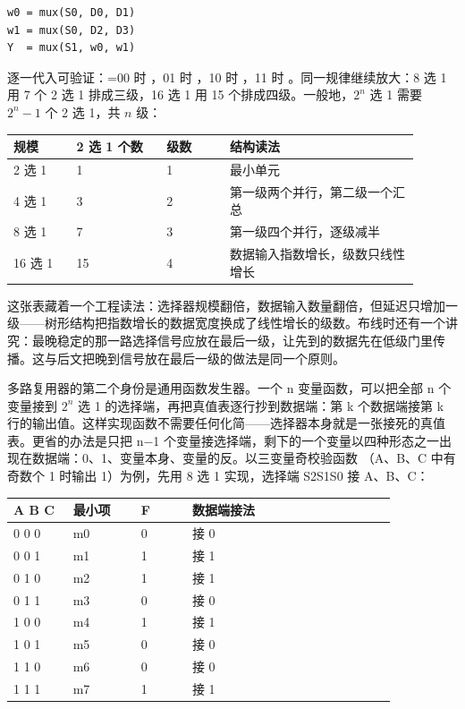 \begin{lstlisting}
w0 = mux(S0, D0, D1)
w1 = mux(S0, D2, D3)
Y  = mux(S1, w0, w1)
\end{lstlisting}

逐一代入可验证：=00 时 ，01 时 ，10 时 ，11 时 。同一规律继续放大：8 选 1 用 7 个 2 选 1 排成三级，16 选 1 用 15 个排成四级。一般地，$2^n$ 选 1 需要 $2^n - 1$ 个 2 选 1，共 $n$ 级：

\begin{longtable}{L{0.14\linewidth}L{0.2\linewidth}L{0.14\linewidth}L{0.42\linewidth}}
\toprule
规模 & 2 选 1 个数 & 级数 & 结构读法 \\
 选 1 & 1 & 1 & 最小单元 \\
4 选 1 & 3 & 2 & 第一级两个并行，第二级一个汇总 \\
8 选 1 & 7 & 3 & 第一级四个并行，逐级减半 \\
16 选 1 & 15 & 4 & 数据输入指数增长，级数只线性增长 \\
\bottomrule
\end{longtable}

这张表藏着一个工程读法：选择器规模翻倍，数据输入数量翻倍，但延迟只增加一级——树形结构把指数增长的数据宽度换成了线性增长的级数。布线时还有一个讲究：最晚稳定的那一路选择信号应放在最后一级，让先到的数据先在低级门里传播。这与后文把晚到信号放在最后一级的做法是同一个原则。

多路复用器的第二个身份是通用函数发生器。一个 n 变量函数，可以把全部 n 个变量接到 $2^n$ 选 1 的选择端，再把真值表逐行抄到数据端：第 k 个数据端接第 k 行的输出值。这样实现函数不需要任何化简——选择器本身就是一张接死的真值表。更省的办法是只把 n$-$1 个变量接选择端，剩下的一个变量以四种形态之一出现在数据端：0、1、变量本身、变量的反。以三变量奇校验函数 （A、B、C 中有奇数个 1 时输出 1）为例，先用 8 选 1 实现，选择端 S2S1S0 接 A、B、C：

\begin{longtable}{L{0.14\linewidth}L{0.16\linewidth}L{0.12\linewidth}L{0.48\linewidth}}
\toprule
A B C & 最小项 & F & 数据端接法 \\
 0 0 & m0 & 0 &  接 0 \\
0 0 1 & m1 & 1 &  接 1 \\
0 1 0 & m2 & 1 &  接 1 \\
0 1 1 & m3 & 0 &  接 0 \\
1 0 0 & m4 & 1 &  接 1 \\
1 0 1 & m5 & 0 &  接 0 \\
1 1 0 & m6 & 0 &  接 0 \\
1 1 1 & m7 & 1 &  接 1 \\
\bottomrule
\end{longtable}

